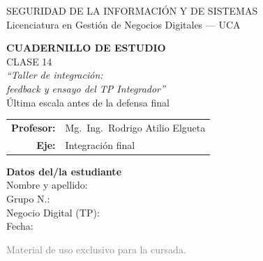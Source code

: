 \documentclass[12pt,a4paper]{article}
\begin{document}
\begin{titlepage}
\centering
\vspace*{1cm}

\begin{cajaTitulo}[width=\textwidth, halign=center]
  SEGURIDAD DE LA INFORMACI\'ON Y DE SISTEMAS\\[4pt]
  {\large Licenciatura en Gesti\'on de Negocios Digitales --- UCA}
\end{cajaTitulo}

\vspace{1.5cm}

{\Huge\bfseries\color{azulUCA} CUADERNILLO DE ESTUDIO}\\[8pt]
{\LARGE\color{doradoUCA} CLASE 14}\\[12pt]
{\Large\itshape ``Taller de integraci\'on:\\[2pt] feedback y ensayo del TP Integrador''}\\[6pt]
{\large\color{doradoFinal}\; \'Ultima escala antes de la defensa final}\\[1.5cm]

\begin{tabular}{rl}
\textbf{Profesor:}   & Mg.\ Ing.\ Rodrigo Atilio Elgueta \\[4pt]
\textbf{Eje:}        & Integraci\'on final \\[4pt]
\end{tabular}

\vfill

\begin{tcolorbox}[colback=grisClaro, colframe=azulUCA, arc=3mm, width=0.9\textwidth]
  \centering
  {\bfseries Datos del/la estudiante}\\[10pt]
  Nombre y apellido: \underline{\hspace{5cm}}\\[10pt]
  Grupo N.\textdegree: \underline{\hspace{5cm}}\\[10pt]
  Negocio Digital (TP): \underline{\hspace{5cm}}\\[10pt]
  Fecha: \underline{\hspace{5cm}}
\end{tcolorbox}

\vspace{1cm}
{\small\textcolor{gray}{Material de uso exclusivo para la cursada.}}
\end{titlepage}
\end{document}

